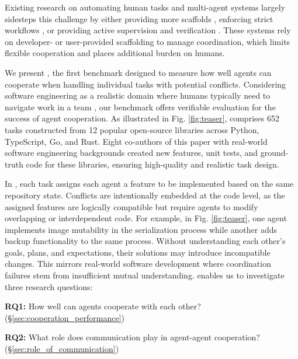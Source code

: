 Existing research on automating human tasks and multi-agent systems largely sidesteps this challenge by either providing more scaffolds \citep{fourney2024magenticonegeneralistmultiagentsolving, pan2025why, zhang2025agentorchestraorchestratinghierarchicalmultiagent, zhuge2024languageagentsoptimizablegraphs}, enforcing strict workflows \citep{hong2023metagpt, nguyen2024agilecoderdynamiccollaborativeagents, cheng2025hawkhierarchicalworkflowframework}, or providing active supervision and verification \citep{huang2025aiwork, xiang2025guardagentsafeguardllmagents, zheng2025webguardbuildinggeneralizableguardrail}. 
These systems rely on developer- or user-provided scaffolding to manage coordination, which limits flexible cooperation and places additional burden on humans.

We present \dataset, the first benchmark designed to measure how well agents can cooperate when handling individual tasks with potential conflicts. 
Considering software engineering as a realistic domain where humans typically need to navigate work in a team \citep{purna2011soft}, our benchmark offers verifiable evaluation for the success of agent cooperation. 
As illustrated in Fig. \ref{fig:teaser}, \dataset comprises 652 tasks constructed from 12 popular open-source libraries across Python, TypeScript, Go, and Rust. 
Eight co-authors of this paper with real-world software engineering backgrounds created new features, unit tests, and ground-truth code for these libraries, ensuring high-quality and realistic task design.

In \dataset, each task assigns each agent a feature to be implemented based on the same repository state. 
Conflicts are intentionally embedded at the code level, as the assigned features are logically compatible but require agents to modify overlapping or interdependent code.
For example, in Fig. \ref{fig:teaser}, one agent implements image mutability in the serialization process while another adds backup functionality to the same process. 
Without understanding each other's goals, plans, and expectations, their solutions may introduce incompatible changes. 
This mirrors real-world software development where coordination failures stem from insufficient mutual understanding. 
\dataset enables us to investigate three research questions:

\noindent\textbf{RQ1:} How well can agents cooperate with each other? (\S\ref{sec:cooperation_performance})

\noindent\textbf{RQ2:} What role does communication play in agent-agent cooperation? (\S\ref{sec:role_of_communication})

